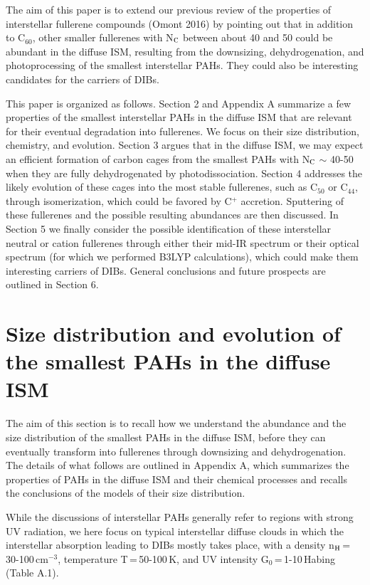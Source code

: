 \documentclass{aa}
\begin{document}
The aim of this paper  is to extend our previous review of the properties of interstellar fullerene compounds (Omont 2016) by pointing out that in addition to  C$_{60}$, other smaller fullerenes with N$_{\rm C}$ between about 40 and 50 could be abundant in the diffuse ISM, resulting from the downsizing, dehydrogenation, and photoprocessing of the smallest interstellar PAHs. 
They could also be interesting candidates for the carriers of DIBs.

This paper is organized as follows. Section 2 and Appendix A summarize a few properties of the smallest interstellar PAHs  in the diffuse ISM that are relevant for their eventual degradation into fullerenes. We focus on their size distribution, chemistry, and evolution. Section 3 argues that in the diffuse ISM, we may expect an efficient formation of carbon cages from the smallest PAHs with N$_{\rm C}$ $\sim$ 40-50 when they are fully dehydrogenated by photodissociation. 
Section 4 addresses the likely evolution of these cages into the most stable fullerenes, such as C$_{50}$ or C$_{44}$, through isomerization, which could be  favored by C$^+$ accretion.
Sputtering of these fullerenes  and the possible resulting abundances are then discussed. 
In Section 5 we finally consider the possible identification of these interstellar  neutral or cation fullerenes through either their mid-IR spectrum or their optical spectrum (for which we performed B3LYP calculations), 
which could make them interesting carriers of DIBs. General conclusions and future prospects are outlined in Section 6.

\section{Size distribution and evolution of the smallest PAHs in the diffuse ISM}

The aim of this section is to recall how we understand the abundance and the size distribution  of the smallest PAHs in the diffuse ISM, before they can eventually transform into fullerenes through downsizing and dehydrogenation. The details of what follows are outlined in Appendix A, which summarizes the  properties of PAHs in the diffuse ISM and their chemical processes and recalls the conclusions of the models of their size distribution.

While the discussions of interstellar PAHs generally refer to regions with strong UV radiation, we here focus on typical interstellar diffuse clouds in which the interstellar absorption leading to DIBs mostly takes place,
with a density n$_{\rm H}$\,=\,30-100\,cm$^{-3}$, temperature T\,=\,50-100\,K, and UV intensity G$_0$\,=\,1-10\,Habing (Table A.1).  
\end{document}
